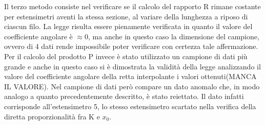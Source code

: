 \documentclass[a4paper,11pt,oneside]{article}
\begin{document}
Il terzo metodo consiste nel verificare se il calcolo del rapporto R rimane costante per estensimetri aventi la stessa sezione, al variare della lunghezza a riposo di ciascun filo. La legge risulta essere pienamente verificata in quanto il valore del coefficiente angolare è $\approx 0$, ma anche in questo caso la dimensione del campione, ovvero di 4 dati rende impossibile poter verificare con certezza tale affermazione.\\


Per il calcolo del prodotto P invece è stato utilizzato un campione di dati più grande e anche in questo caso si è dimostrata la validità della legge analizzando il valore del coefficiente angolare della retta interpolante i valori ottenuti(MANCA IL VALORE). Nel campione di dati però compare un dato anomalo che, in modo analogo a quanto precedentemente descritto, è stato reiettato. Il dato infatti corrisponde all'estensimetro 5, lo stesso estensimetro scartato nella verifica della diretta proporzionalità fra K e $x_{0}$.\\
\end{document}
